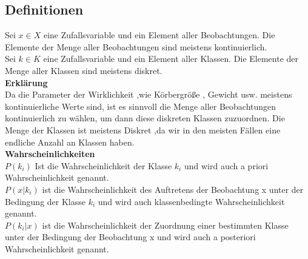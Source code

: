 
\subsection{Definitionen}

Sei \begin{math} x \in X \end{math} eine Zufallsvariable und ein Element  aller Beobachtungen. Die Elemente der Menge aller Beobachtungen sind meistens kontinuierlich. \\ \newline 
Sei \begin{math} k \in K \end{math} eine Zufallsvariable und ein Element aller Klassen.
Die Elemente der Menge aller Klassen sind meistens diskret.\\ \newline
\textbf{Erkl\"arung} \\ \newline 
Da die Parameter der Wirklichkeit ,wie K\"orbergr\"oße , Gewicht usw.  meistens kontinuierliche Werte sind, ist es sinnvoll die Menge aller Beobachtungen kontinuierlich zu wählen, um dann diese diskreten Klassen zuzuordnen. Die Menge der Klassen ist meistens Diskret ,da wir in den meisten Fällen eine endliche Anzahl an Klassen haben.\\ \newline
\textbf{Wahrscheinlichkeiten}\\ \newline
\begin{math} P(k_{i}) \end{math} Ist die Wahrscheinlichkeit der Klasse $ k_{i}$ und wird auch a priori Wahrscheinlichkeit genannt.\\ \newline
$P(x|k_{i})$ ist die Wahrscheinlichkeit des Auftretens der Beobachtung x unter der  Bedingung der Klasse $k_{i}$ und wird auch klassenbedingte Wahrscheinlichkeit genannt.\\ \newline
$P(k_{i}|x)$ ist die Wahrscheinlichkeit der Zuordnung einer bestimmten Klasse unter der Bedingung der Beobachtung x und wird auch a posteriori Wahrscheinlichkeit genannt.
